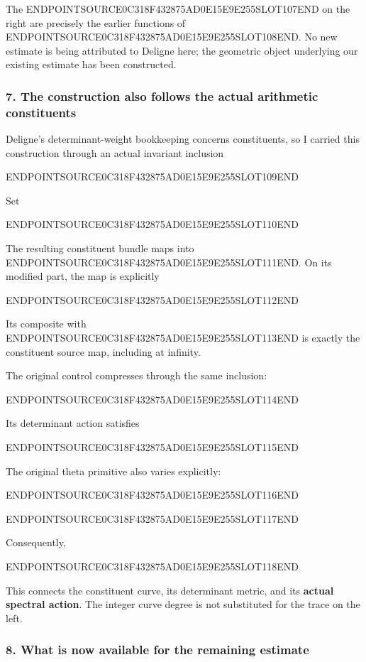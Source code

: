 The ENDPOINTSOURCE0C318F432875AD0E15E9E255SLOT107END on the right are precisely the earlier functions of ENDPOINTSOURCE0C318F432875AD0E15E9E255SLOT108END. No new estimate is being attributed to Deligne here; the geometric object underlying our existing estimate has been constructed.

\subsubsection{7. The construction also follows the actual arithmetic constituents}\label{endpoint-curvature_original--the-construction-also-follows-the-actual-arithmetic-constituents}

Deligne's determinant-weight bookkeeping concerns constituents, so I carried this construction through an actual invariant inclusion

ENDPOINTSOURCE0C318F432875AD0E15E9E255SLOT109END

Set

ENDPOINTSOURCE0C318F432875AD0E15E9E255SLOT110END

The resulting constituent bundle maps into ENDPOINTSOURCE0C318F432875AD0E15E9E255SLOT111END. On its modified part, the map is explicitly

ENDPOINTSOURCE0C318F432875AD0E15E9E255SLOT112END

Its composite with ENDPOINTSOURCE0C318F432875AD0E15E9E255SLOT113END is exactly the constituent source map, including at infinity.

The original control compresses through the same inclusion:

ENDPOINTSOURCE0C318F432875AD0E15E9E255SLOT114END

Its determinant action satisfies

ENDPOINTSOURCE0C318F432875AD0E15E9E255SLOT115END

The original theta primitive also varies explicitly:

ENDPOINTSOURCE0C318F432875AD0E15E9E255SLOT116END

ENDPOINTSOURCE0C318F432875AD0E15E9E255SLOT117END

Consequently,

ENDPOINTSOURCE0C318F432875AD0E15E9E255SLOT118END

This connects the constituent curve, its determinant metric, and its \textbf{actual spectral action}. The integer curve degree is not substituted for the trace on the left.

\subsubsection{8. What is now available for the remaining estimate}\label{endpoint-curvature_original--what-is-now-available-for-the-remaining-estimate}


